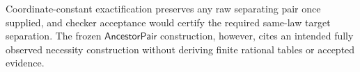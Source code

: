 Coordinate-constant exactification preserves any raw separating pair once supplied, and checker acceptance would certify the required same-law target separation. The frozen \(\mathsf{AncestorPair}\) construction, however, cites an intended fully observed necessity construction without deriving finite rational tables or accepted evidence.